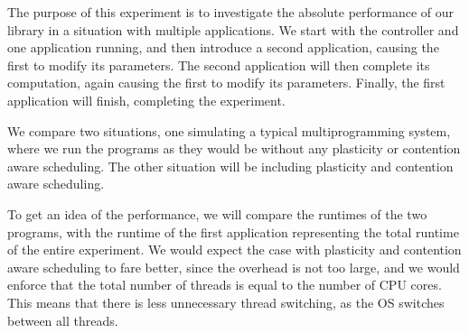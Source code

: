 The purpose of this experiment is to investigate the absolute performance of our library in a situation with multiple applications. We start with the controller and one application running, and then introduce a second application, causing the first to modify its parameters. The second application will then complete its computation, again causing the first to modify its parameters. Finally, the first application will finish, completing the experiment. 

We compare two situations, one simulating a typical multiprogramming system, where we run the programs as they would be without any plasticity or contention aware scheduling. The other situation will be including plasticity and contention aware scheduling.

To get an idea of the performance, we will compare the runtimes of the two programs, with the runtime of the first application representing the total runtime of the entire experiment. We would expect the case with plasticity and contention aware scheduling to fare better, since the overhead is not too large, and we would enforce that the total number of threads is equal to the number of CPU cores. This means that there is less unnecessary thread switching, as the OS switches between all threads.

